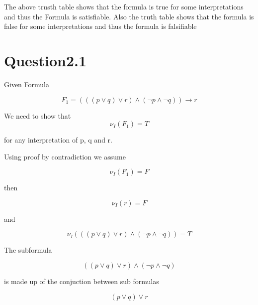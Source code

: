 \documentclass[10pt,a4paper]{article}
\newcommand{\interp}{I}
\begin{document}
The above trusth table shows that the formula is true for some interpretations and thus the Formula is satisfiable. 
Also the truth table shows that the formula is false for some interpretations and thus the formula is falsifiable















\section{Question2.1}

Given Formula 


\newcommand{\ti}{\nu_\interp}


\begin{equation}
 F_1  = ((( p \vee q) \vee r ) \wedge ( \neg p \wedge \neg q )) \rightarrow r
\end{equation}

We need to show that 
\begin{equation}
\label{21prove}
 \ti (F_1) = T
\end{equation}

for any interpretation of p, q and r.

Using proof by contradiction we assume

\begin{equation}
\label{21ass}
 \ti (F_1 ) = F
\end{equation}

then 

\begin{equation}
 \ti(r) = F
\end{equation}

 and
 
 \begin{equation}
 \label{21}
\ti((( p \vee q) \vee r ) \wedge ( \neg p \wedge \neg q )) = T  
 \end{equation}

The subformula 

\begin{equation}
(( p \vee q) \vee r ) \wedge ( \neg p \wedge \neg q )
\end{equation}

is made up of the conjuction between sub formulas

\begin{equation}
\label{211}
( p \vee q) \vee r 
\end{equation}
\end{document}
